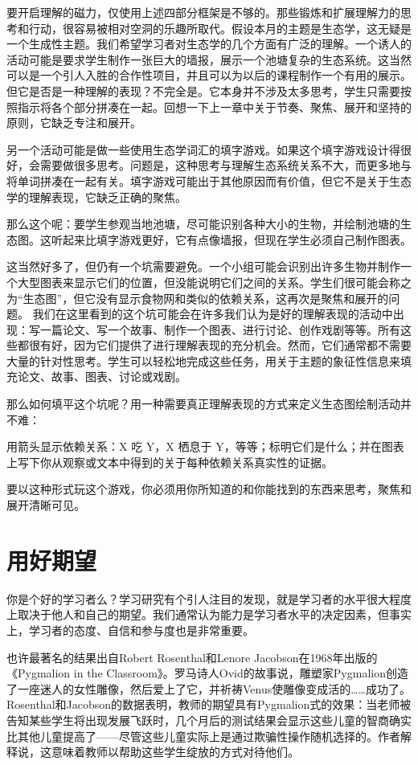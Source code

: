 要开启理解的磁力，仅使用上述四部分框架是不够的。那些锻炼和扩展理解力的思考和行动，很容易被相对空洞的乐趣所取代。假设本月的主题是生态学，这无疑是一个生成性主题。我们希望学习者对生态学的几个方面有广泛的理解。一个诱人的活动可能是要求学生制作一张巨大的墙报，展示一个池塘复杂的生态系统。这当然可以是一个引人入胜的合作性项目，并且可以为以后的课程制作一个有用的展示。但它是否是一种理解的表现？不完全是。它本身并不涉及太多思考，学生只需要按照指示将各个部分拼凑在一起。回想一下上一章中关于节奏、聚焦、展开和坚持的原则，它缺乏专注和展开。

另一个活动可能是做一些使用生态学词汇的填字游戏。如果这个填字游戏设计得很好，会需要做很多思考。问题是，这种思考与理解生态系统关系不大，而更多地与将单词拼凑在一起有关。填字游戏可能出于其他原因而有价值，但它不是关于生态学的理解表现，它缺乏正确的聚焦。

那么这个呢：要学生参观当地池塘，尽可能识别各种大小的生物，并绘制池塘的生态图。这听起来比填字游戏更好，它有点像墙报，但现在学生必须自己制作图表。

这当然好多了，但仍有一个坑需要避免。一个小组可能会识别出许多生物并制作一个大型图表来显示它们的位置，但没能说明它们之间的关系。学生们很可能会称之为“生态图”，但它没有显示食物网和类似的依赖关系，这再次是聚焦和展开的问题。
我们在这里看到的这个坑可能会在许多我们认为是好的理解表现的活动中出现：写一篇论文、写一个故事、制作一个图表、进行讨论、创作戏剧等等。所有这些都很有好，因为它们提供了进行理解表现的充分机会。然而，它们通常都不需要大量的针对性思考。学生可以轻松地完成这些任务，用关于主题的象征性信息来填充论文、故事、图表、讨论或戏剧。

那么如何填平这个坑呢？用一种需要真正理解表现的方式来定义生态图绘制活动并不难：

用箭头显示依赖关系：X 吃 Y，X 栖息于 Y，等等；标明它们是什么；并在图表上写下你从观察或文本中得到的关于每种依赖关系真实性的证据。

要以这种形式玩这个游戏，你必须用你所知道的和你能找到的东西来思考，聚焦和展开清晰可见。

\section*{用好期望}

你是个好的学习者么？学习研究有个引人注目的发现，就是学习者的水平很大程度上取决于他人和自己的期望。我们通常认为能力是学习者水平的决定因素，但事实上，学习者的态度、自信和参与度也是非常重要。

也许最著名的结果出自Robert Rosenthal和Lenore Jacobson在1968年出版的《Pygmalion in the Classroom》。罗马诗人Ovid的故事说，雕塑家Pygmalion创造了一座迷人的女性雕像，然后爱上了它，并祈祷Venus使雕像变成活的……成功了。Rosenthal和Jacobson的数据表明，教师的期望具有Pygmalion式的效果：当老师被告知某些学生将出现发展飞跃时，几个月后的测试结果会显示这些儿童的智商确实比其他儿童提高了——尽管这些儿童实际上是通过欺骗性操作随机选择的。作者解释说，这意味着教师以帮助这些学生绽放的方式对待他们。

